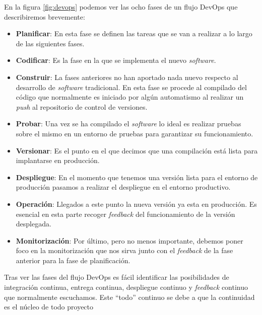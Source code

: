 En la figura \ref{fig:devops} podemos ver las ocho fases de un flujo DevOps que describiremos brevemente: 

\begin{itemize}
\item \textbf{Planificar}:  En esta fase se definen las tareas que se van a realizar a lo largo de las siguientes fases. 

\item \textbf{Codificar}: Es la fase en la que se implementa el nuevo \textit{software}.

\item \textbf{Construir}: La fases anteriores no han aportado nada nuevo respecto al desarrollo de \textit{software} tradicional. En esta fase se procede al compilado del código que normalmente es iniciado por algún automatismo al realizar un \textit{push} al repositorio de control de versiones.

\item \textbf{Probar}: Una vez se ha compilado el \textit{software} lo ideal es realizar pruebas sobre el mismo en un entorno de pruebas para garantizar su  funcionamiento.

\item \textbf{Versionar}: Es el punto en el que decimos que una compilación está lista para implantarse en producción. 

\item \textbf{Despliegue}: En el momento que tenemos una versión lista para el entorno de producción pasamos a realizar el despliegue en el entorno productivo.

\item \textbf{Operación}: Llegados a este punto la nueva versión ya esta en producción. Es esencial en esta parte recoger \textit{feedback} del funcionamiento de la versión desplegada.

\item \textbf{Monitorización}: Por último, pero no menos importante, debemos poner foco en la monitorización que nos sirva junto con el \textit{feedback} de la fase anterior para la fase de planificación.


 \end{itemize}


Tras ver las fases del flujo DevOps es fácil identificar las posibilidades de integración continua, entrega continua, despliegue continuo y \textit{feedback} continuo que normalmente escuchamos. Este ``todo'' continuo se debe a que la continuidad es el núcleo de todo proyecto 

